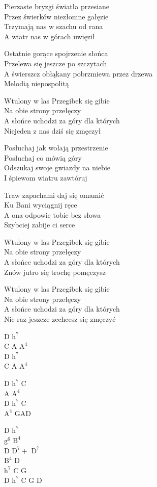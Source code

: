 \begin{text}
Pierzaste bryzgi światła przesiane\\
Przez świerków niezłomne gałęzie\\
Trzymają nas w szachu od rana\\
A wiatr nas w górach uwięził

Ostatnie gorące spojrzenie słońca\\
Przelewa się jeszcze po szczytach\\
A świerszcz obłąkany pobrzmiewa przez drzewa\\
Melodią niepospolitą

\vin Wtulony w las Przegibek się gibie\\
\vin Na obie strony przełęczy\\
\vin A słońce uchodzi za góry dla których\\
\vin Niejeden z nas dziś się zmęczył

\hfill\break
Posłuchaj jak wołają przestrzenie\\
Posłuchaj co mówią góry\\
Odszukaj swoje gwiazdy na niebie\\
I śpiewom wiatru zawtóruj

Traw zapachami daj się omamić\\
Ku Bani wyciągnij ręce\\
A ona odpowie tobie bez słowa\\
Szybciej zabije ci serce

Wtulony w las Przegibek się gibie\\
Na obie strony przełęczy\\
A słońce uchodzi za góry dla których\\
Znów jutro się trochę pomęczysz

Wtulony w las Przegibek się gibie\\
Na obie strony przełęczy\\
A słońce uchodzi za góry dla których\\
Nie raz jeszcze zechcesz się zmęczyć
\end{text}
\begin{chord}
    D $\mathrm{h^7}$\\
    C A $\mathrm{A^4}$\\
    D $\mathrm{h^7}$\\
    C A $\mathrm{A^4}$

    D $\mathrm{h^7}$ C\\
    A $\mathrm{A^4}$\\
    D $\mathrm{h^7}$ C\\
    $\mathrm{A^4}$ GAD

    D $\mathrm{h^7}$\\
    $\mathrm{g^6}$ $\mathrm{B^4}$\\
    D $\mathrm{D^7+}$ $\mathrm{D^7}$\\
    $\mathrm{B^4}$ D\\
    $\mathrm{h^7}$ C G\\
    D $\mathrm{h^7}$ C G D
\end{chord}
